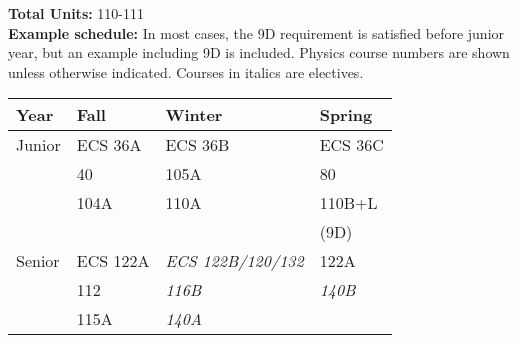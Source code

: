 \documentclass[12pt]{article}
\begin{document}
{\bf Total Units:} 110-111\\
\vskip 0.25cm
\noindent
{\bf Example schedule:} In most cases, the 9D requirement is
satisfied before junior year, but an example including 9D is included.
Physics course numbers are shown unless otherwise indicated.  Courses
in italics are electives.\\
\begin{center}
\begin{tabular}{|l|l|l|l|}
\hline
Year      & Fall    & Winter & Spring \\
\hline
Junior    & ECS 36A    & ECS 36B      & ECS 36C \\
          & 40         & 105A         & 80 \\
          & 104A       & 110A         & 110B+L \\
          &            &              & (9D) \\         
\hline
Senior   & ECS 122A    & {\it ECS 122B/120/132} & 122A \\
         & 112         & {\it 116B}             & {\it 140B}\\
         & 115A        & {\it 140A}             & \\
\hline
\end{tabular}
\end{center}
\end{document}
